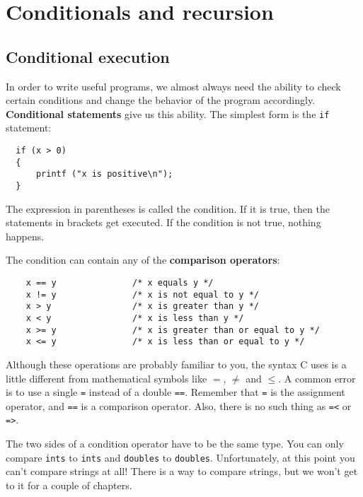 

\chapter{Conditionals and recursion}
\label{condrecursion}


\section{Conditional execution}

In order to write useful programs, we almost always need the ability
to check certain conditions and change the behavior of the program
accordingly.  {\bf Conditional statements} give us this ability.  The
simplest form is the {\tt if} statement:

\begin{verbatim}
  if (x > 0) 
  {
      printf ("x is positive\n");
  }
\end{verbatim}
%
The expression in parentheses is called the condition.
If it is true, then the statements in brackets get executed.
If the condition is not true, nothing happens.


The condition can contain any of the {\bf comparison operators}:

\begin{verbatim}
    x == y               /* x equals y */
    x != y               /* x is not equal to y */
    x > y                /* x is greater than y */
    x < y                /* x is less than y */
    x >= y               /* x is greater than or equal to y */
    x <= y               /* x is less than or equal to y */
\end{verbatim}
%
Although these operations are probably familiar to you, the
syntax C uses is a little different from mathematical
symbols like $=$, $\neq$ and $\le$.  A common error is
to use a single {\tt =} instead of a double {\tt ==}.  Remember
that {\tt =} is the assignment operator, and {\tt ==} is
a comparison operator.  Also, there is no such thing as
{\tt =<} or {\tt =>}.

The two sides of a condition operator have to be the same
type.  You can only compare {\tt ints} to {\tt ints} and
{\tt doubles} to {\tt doubles}.  Unfortunately, at this
point you can't compare strings at all!  There is
a way to compare strings, but we won't get to it for a couple
of chapters.

